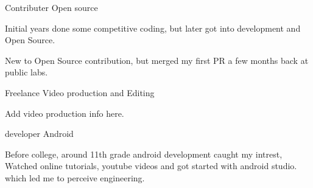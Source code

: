 

\begin{cventries}
  \cventry
    {Contributer} %
    {Open source} %
    {} %
    {} %
    {
      \begin{cvitems} %
        \item {Initial years done some competitive coding, but later got into development and Open Source.}
        \item {New to Open Source contribution, but merged my first PR a few months back at public labs.}
      \end{cvitems}
    }
  \cventry
    {Freelance} %
    {Video production and Editing} %
    {} %
    {} %
    {
      \begin{cvitems} %
        \item {Add video production info here.}
      \end{cvitems}
    }


  \cventry
    {developer} %
    {Android} %
    {} %
    {} %
    {
      \begin{cvitems} %
        \item {Before college, around 11th grade android development caught my intrest, Watched online tutorials, youtube videos and got started with android studio. which led me to perceive engineering.}
      \end{cvitems}
    } 


    
    

\end{cventries}
